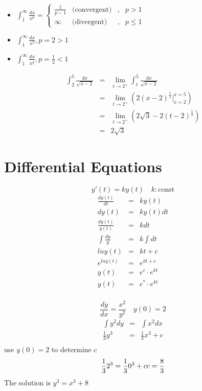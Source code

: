 \begin{notn}
\begin{itemize}
\item \(\displaystyle \int^\infty_1 \frac{dx}{x^p}  = \left\{ \begin{array}{rccl}
\displaystyle \frac{1}{p-1} & \text{(convergent)} & , & p >1\\
\infty & \text{(divergent)} & , & p \leq 1
\end{array}\right.\)
\item \(\displaystyle \int^\infty_1 \frac{dx}{x^2} ,  p=2 > 1\)
\item \(\displaystyle \int^\infty_1 \frac{dx}{x^{\frac{1}{2}}},  p =\frac{1}{2} < 1\)
\end{itemize}
\end{notn}
\begin{eg}
\[\begin{array}{rcl}
\displaystyle \int^5_2 \frac{dx}{\sqrt{x-2}} & = & \displaystyle \lim_{t \to 2^+} \int^5_t \frac{dx}{\sqrt{x-2}}\\
& = & \displaystyle \lim_{t \to 2^+} (2(x-2)^{\frac{1}{2}} |^{x=5}_{x=2})\\
& = & \displaystyle \lim_{t \to 2^+} (2\sqrt{3} - 2(t-2)^{\frac{1}{2}})\\
& = & 2\sqrt{3}
\end{array}\]
\end{eg}
\section{Differential Equations}
\begin{defn}
\[y'(t) = ky(t) \quad k: \text{const}\]
\[\begin{array}{rcl}
\displaystyle \frac{dy(t)}{dt} & = & ky(t)\\
dy(t) & = & ky(t) dt\\
\displaystyle \frac{dy(t)}{y(t)} & = & kdt\\
\displaystyle \int \frac{dy}{y} & = & \displaystyle k \int dt\\
ln y(t) & = & kt + c\\
e^{ln y(t)} & = & e^{kt + c}\\
y(t) & = & e^c \cdot e^{kt}\\
y(t) & = & c^* \cdot e^{kt}\\
\end{array}\]
\end{defn}
\begin{eg}
\[\displaystyle \frac{dy}{dx} = \frac{x^2}{y^2} \quad y(0) =2\]
\[\begin{array}{rcl}
\displaystyle \int y^2dy & = & \displaystyle \int x^2 dx\\
\displaystyle \frac{1}{3} y^3 & = & \displaystyle \frac{1}{3} x^3 +c\\
\end{array}\]
use \(y(0) = 2\) to determine \(c\)
\[\displaystyle \frac{1}{3}2^3  = \displaystyle \frac{1}{3} 0^3 +c\\
c = \displaystyle \frac{8}{3}\] 
The solution is \( y^3 = x^3 + 8\)
\end{eg}